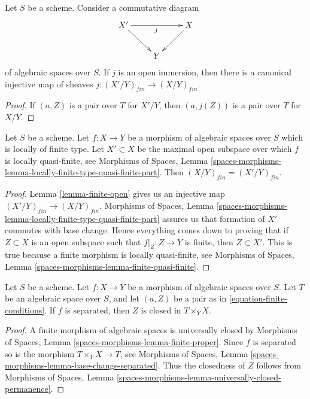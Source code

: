 \begin{lemma}
\label{lemma-finite-open}
Let $S$ be a scheme. Consider a commutative diagram
$$
\xymatrix{
X' \ar[rr]_j \ar[rd] & & X \ar[ld] \\
& Y
}
$$
of algebraic spaces over $S$. If $j$ is an open immersion, then
there is a canonical injective map of sheaves
$j : (X'/Y)_{fin} \to (X/Y)_{fin}$.
\end{lemma}

\begin{proof}
If $(a, Z)$ is a pair over $T$ for $X'/Y$, then
$(a, j(Z))$ is a pair over $T$ for $X/Y$.
\end{proof}

\begin{lemma}
\label{lemma-finite-lives-on-locally-quasi-finite-part}
Let $S$ be a scheme.
Let $f : X \to Y$ be a morphism of algebraic spaces over $S$ which is
locally of finite type.
Let $X' \subset X$ be the maximal open subspace over which $f$ is
locally quasi-finite, see
Morphisms of Spaces,
Lemma \ref{spaces-morphisms-lemma-locally-finite-type-quasi-finite-part}.
Then $(X/Y)_{fin} = (X'/Y)_{fin}$.
\end{lemma}

\begin{proof}
Lemma \ref{lemma-finite-open}
gives us an injective map $(X'/Y)_{fin} \to (X/Y)_{fin}$.
Morphisms of Spaces,
Lemma \ref{spaces-morphisms-lemma-locally-finite-type-quasi-finite-part}
assures us that formation of $X'$ commutes with base change.
Hence everything comes down to proving that if
$Z \subset X$ is an open subspace such that $f|_Z : Z \to Y$ is finite,
then $Z \subset X'$. This is true because a finite morphism
is locally quasi-finite, see
Morphisms of Spaces, Lemma \ref{spaces-morphisms-lemma-finite-quasi-finite}.
\end{proof}

\begin{lemma}
\label{lemma-finite-separated}
Let $S$ be a scheme.
Let $f : X \to Y$ be a morphism of algebraic spaces over $S$.
Let $T$ be an algebraic space over $S$, and let $(a, Z)$ be
a pair as in \ref{equation-finite-conditions}.
If $f$ is separated, then $Z$ is closed in $T \times_Y X$.
\end{lemma}

\begin{proof}
A finite morphism of algebraic spaces is universally closed by
Morphisms of Spaces, Lemma \ref{spaces-morphisms-lemma-finite-proper}.
Since $f$ is separated so is the morphism $T \times_Y X \to T$, see
Morphisms of Spaces, Lemma \ref{spaces-morphisms-lemma-base-change-separated}.
Thus the closedness of $Z$ follows from
Morphisms of Spaces,
Lemma \ref{spaces-morphisms-lemma-universally-closed-permanence}.
\end{proof}

